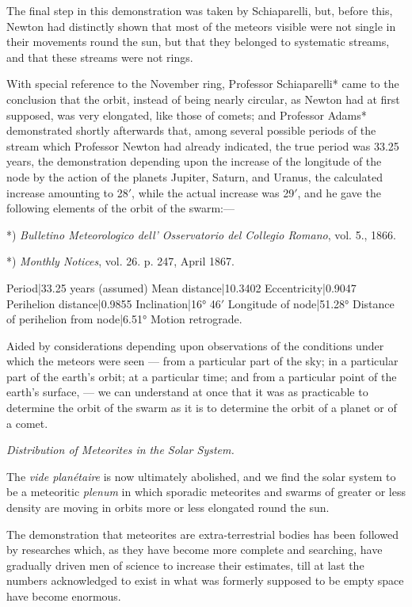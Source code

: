 \documentclass[a4paper, 12pt, oneside, polutonikogreek, english]{article}
\begin{document}
The final step in this demonstration was taken by Schiaparelli, but, before this, Newton had distinctly shown that most of the meteors visible were not single in their movements round the sun, but that they belonged to systematic streams, and that these streams were not rings.

With special reference to the November ring, Professor Schiaparelli* came to the conclusion that the orbit, instead of being nearly circular, as Newton had at first supposed, was very elongated, like those of comets; and Professor Adams* demonstrated shortly afterwards that, among several possible periods of the stream which Professor Newton had already indicated, the true period was 33.25 years, the demonstration depending upon the increase of the longitude of the node by the action of the planets Jupiter, Saturn, and Uranus, the calculated increase amounting to 28$\prime$, while the actual increase was 29$\prime$, and he gave the following elements of the orbit of the swarm:---

*) \emph{Bulletino Meteorologico dell' Osservatorio del Collegio Romano}, vol. 5., 1866.

*) \emph{Monthly Notices}, vol. 26. p. 247, April 1867.

Period|33.25 years (assumed) 
Mean distance|10.3402 
Eccentricity|0.9047 
Perihelion distance|0.9855 
Inclination|16° 46$\prime$  
Longitude of node|51.28° 
Distance of perihelion from node|6.51° 
Motion retrograde.

Aided by considerations depending upon observations of the conditions under which the meteors were seen --- from a particular part of the sky; in a particular part of the earth's orbit; at a particular time; and from a particular point of the earth's surface, --- we can understand at once that it was as practicable to determine the orbit of the swarm as it is to determine the orbit of a planet or of a comet.

\emph{Distribution of Meteorites in the Solar System.}

The \emph{vide planétaire} is now ultimately abolished, and we find the solar system to be a meteoritic \emph{plenum} in which sporadic meteorites and swarms of greater or less density are moving in orbits more or less elongated round the sun.

The demonstration that meteorites are extra-terrestrial bodies has been followed by researches which, as they have become more complete and searching, have gradually driven men of science to increase their estimates, till at last the numbers acknowledged to exist in what was formerly supposed to be empty space have become enormous.
\end{document}
